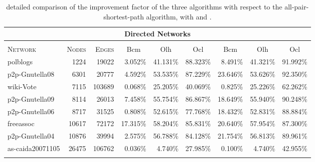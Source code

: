 \documentclass{acm_proc_article-sp}
\newcommand{\deltabfs}{{\sc Olh}}
\newcommand{\sampl}{{\sc Ocl}}
\newcommand{\newalg}{{\sc Bcm}}
\begin{document}
\begin{table*}[tb]
\caption{detailed comparison of the improvement factor of the three algorithms with respect to the all-pair-shortest-path algorithm, with  and .}
\label{tab:compext}
\centering
\begin{scriptsize}
\begin{tabular}{|l|r|r|r|r|r|r|r|r|}
\multicolumn{9}{c}{\textbf{Directed Networks}} \\
\hline
     & &  &  \multicolumn{3}{c|}{} & \multicolumn{3}{c|}{} \\
\textsc{Network} & \textsc{Nodes} & \textsc{Edges} & \multicolumn{1}{c|}{\newalg} & \multicolumn{1}{c|}{\deltabfs} & \multicolumn{1}{c|}{\sampl} & \multicolumn{1}{c|}{\newalg} & \multicolumn{1}{c|}{\deltabfs} & \multicolumn{1}{c|}{\sampl} \\
\hline
 polblogs                          &     1224     &     19022     &     3.052\%     &     41.131\%     &     88.323\%     &     8.491\%     &     41.321\%     &     91.992\%\\ 
 p2p-Gnutella08           &     6301     &     20777     &     4.592\%     &     53.535\%     &     87.229\%     &     23.646\%     &     53.626\%     &     92.350\%\\ 
 wiki-Vote                 &     7115     &     103689     &     0.068\%     &     25.205\%     &     40.069\%     &     0.825\%     &     25.226\%     &     62.262\%\\ 
 p2p-Gnutella09           &     8114     &     26013     &     7.458\%     &     55.754\%     &     86.867\%     &     18.649\%     &     55.940\%     &     90.248\%\\ 
 p2p-Gnutella06           &     8717     &     31525     &     0.808\%     &     52.615\%     &     77.768\%     &     18.432\%     &     52.831\%     &     88.884\%\\ 
 freeassoc                         &     10617     &     72172     &     17.315\%     &     58.204\%     &     85.831\%     &     20.640\%     &     57.954\%     &     87.300\%\\ 
 p2p-Gnutella04           &     10876     &     39994     &     2.575\%     &     56.788\%     &     84.128\%     &     21.754\%     &     56.813\%     &     89.961\%\\ 
 as-caida20071105             &     26475     &     106762     &     0.036\%     &     4.740\%     &     27.985\%     &     0.100\%     &     4.740\%     &     42.955\%\\ 
\hline
\multicolumn{9}{c}{}\\

\end{tabular}
\end{scriptsize}
\end{table*}
\end{document}
